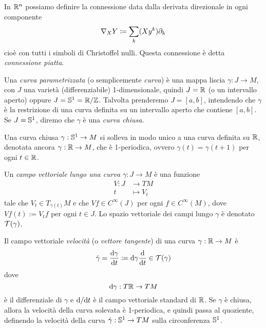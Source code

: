 	\begin{es}\label{es: connessione patta}
		In \(\mathbb{R}^n\) possiamo definire la connessione data dalla derivata direzionale in ogni componente
		\[
			\nabla_ X Y \coloneq \sum_k (Xy^k) \partial_k
		\]
		cioè con tutti i simboli di Christoffel nulli. Questa connessione è detta \textit{connessione piatta}. 
	\end{es}

	\begin{defi}\label{def: curva}
		Una \textit{curva parametrizzata} (o semplicemente \textit{curva}) è una mappa liscia \(\gamma: J \to M\), con \(J\) una varietà (differenziabile) 1-dimensionale, quindi \(J=\mathbb{R}\) (o un intervallo aperto) oppure \(J=\mathbb{S}^1 = \mathbb{R}/\mathbb{Z}\).  Talvolta prenderemo \(J=[a,b]\), intendendo che \(\gamma\) è la restrizione di una curva definita su un intervallo aperto che contiene \([a,b]\). Se \(J= \mathbb{S}^1\), diremo che \(\gamma\) è una \textit{curva chiusa}. 
	\end{defi}
	Una curva chiusa \(\gamma:\mathbb{S}^1 \to M\) si solleva in modo unico a una curva definita su \(\mathbb{R}\), denotata ancora \(\gamma:\mathbb{R} \to M\), che è 1-periodica, ovvero \(\gamma(t)=\gamma(t+1)\) per ogni \(t \in \mathbb{R}\).
	
	\begin{defi}
		Un \textit{campo vettoriale lungo una curva} \(\gamma:J \to M\) è una funzione
		\begin{align*}
			V: J &\to TM \\
			t &\mapsto V_t
		\end{align*}
		tale che \(V_t \in T_{\gamma(t)}M\) e che \(Vf \in C^\infty(J)\) per ogni \(f \in C^\infty(M)\), dove \(Vf(t):=V_t f\) per ogni \(t \in J\). Lo spazio vettoriale dei campi lungo \(\gamma\) è denotato \(\mathcal{T}(\gamma)\). 
		
		Il campo vettoriale \textit{velocità} (o \textit{vettore tangente}) di una curva \(\gamma:\mathbb{R} \to M\) è 
		\[
		\dot \gamma = \frac{\mathrm{d} \gamma}{\mathrm{d} t} \coloneq \mathrm{d} \gamma \frac{\mathrm{d}}{\mathrm{d} t} \in \mathcal{T}(\gamma)
		\]
		dove
		\[
		\mathrm{d} \gamma:T\mathbb{R} \to TM
		\]
		è il differenziale di \(\gamma\) e \(\mathrm{d}/\mathrm{d} t\) è il campo vettoriale standard di \(\mathbb{R}\). Se \(\gamma\) è chiusa, allora la velocità della curva solevata è 1-periodica, e quindi passa al quoziente, definendo la velocità della curva \(\dot \gamma:\mathbb{S}^1 \to TM\) sulla circonferenza \(\mathbb{S}^1\). 
	\end{defi}
	
